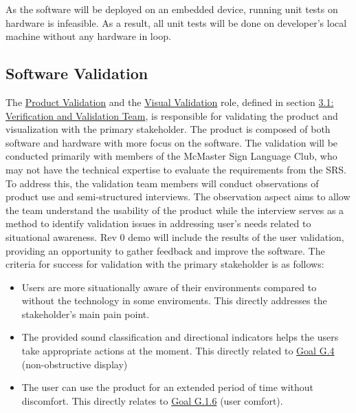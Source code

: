\documentclass[12pt, titlepage]{article}
\begin{document}
As the software will be deployed on an embedded device, running unit tests on
hardware is infeasible. As a result, all unit tests will be done on developer's
local machine without any hardware in loop.

\subsection{Software Validation}\label{sec:software_validation}

The \hyperref[role:product_validation]{Product Validation} and 
the \hyperref[role:visual_vnv]{Visual Validation} role, defined in
section \hyperref[sec:vnv_team]{3.1: Verification and Validation Team}, is
responsible for validating the product and visualization with the primary
stakeholder. The product
is composed of both software and hardware with more focus on the software. The
validation will be conducted primarily with members of the McMaster Sign
Language Club, who may not have the technical expertise to evaluate the
requirements from the SRS. To address this, the validation team members
will conduct observations of product use and semi-structured interviews.
The observation aspect aims to allow the team understand the usability of the
product while the interview serves as a method to identify validation issues
in addressing user's needs related to situational awareness. Rev 0 demo will
include the results of the user validation, providing an opportunity to gather
feedback and improve the software.
\newline
\newline
The criteria for success for validation with the primary stakeholder is as
follows:

\begin{itemize}
  \item Users are more situationally aware of their environments compared to
  without the technology in some enviroments. This directly addresses the
  stakeholder's main pain point.
  \item The provided sound classification and directional indicators helps the
  users take appropriate actions at the moment. This directly related to
  \hyperref[SRS-goal:visual_display]{Goal G.4} (non-obstructive display)
  \item The user can use the product for an extended period of time without
  discomfort. This directly relates to
  \hyperref[SRS-goal:user_comfort]{Goal G.1.6} (user comfort).
\end{itemize}
\end{document}
